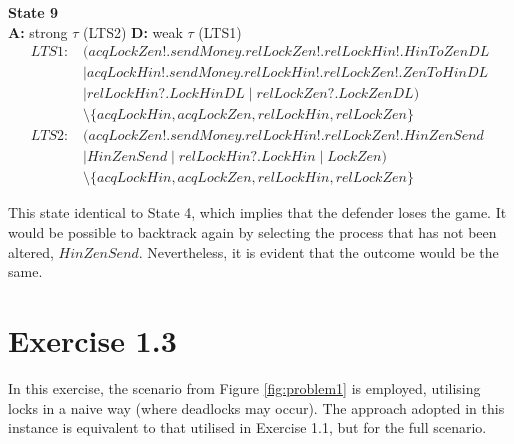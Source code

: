 \documentclass{report}
\begin{document}
\begin{mdframed}
\textbf{State 9} \\
\textbf{A:} strong $\tau$ (LTS2) \quad \textbf{D:} weak $\tau$ (LTS1)
\begin{align*}
\textit{LTS1:}\; & (\mathit{acqLockZen!}.\mathit{sendMoney}.\mathit{relLockZen!}.\mathit{relLockHin!}.\mathit{HinToZenDL} \\
                 & \mid \mathit{acqLockHin!}.\mathit{sendMoney}.\mathit{relLockHin!}.\mathit{relLockZen!}.\mathit{ZenToHinDL} \\
                 & \mid \mathit{relLockHin?}.\mathit{LockHinDL} \mid \mathit{relLockZen?}.\mathit{LockZenDL}) \\
                 & \setminus \{\mathit{acqLockHin}, \mathit{acqLockZen}, \mathit{relLockHin}, \mathit{relLockZen}\} \\[6pt]
\textit{LTS2:}\; & (\mathit{acqLockZen!}.\mathit{sendMoney}.\mathit{relLockHin!}.\mathit{relLockZen!}.\mathit{HinZenSend} \\
                 & \mid \mathit{HinZenSend} \mid \mathit{relLockHin?}.\mathit{LockHin} \mid \mathit{LockZen}) \\
                 & \setminus \{\mathit{acqLockHin}, \mathit{acqLockZen}, \mathit{relLockHin}, \mathit{relLockZen}\}
\end{align*}
\end{mdframed}

\noindent This state identical to State 4, which implies that the defender loses the game. It would be possible to backtrack again by selecting the process that has not been altered, $\mathit{HinZenSend}$. Nevertheless, it is evident that the outcome would be the same.

\section*{Exercise 1.3}
In this exercise, the scenario from Figure \ref{fig:problem1} is employed, utilising locks in a naive way (where deadlocks may occur). The approach adopted in this instance is equivalent to that utilised in Exercise 1.1, but for the full scenario.
\end{document}
